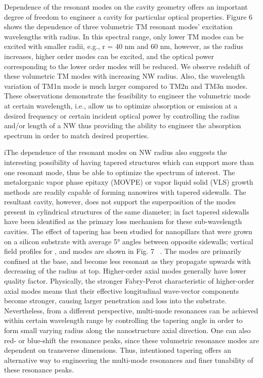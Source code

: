 Dependence of the resonant modes on the cavity geometry offers an important
degree of freedom to engineer a cavity for particular optical properties.
Figure 6 shows the dependence of three volumetric TM resonant modes’ excitation
wavelengths with radius. In this spectral range, only lower TM modes can be
excited with smaller radii, e.g., r = 40 nm and 60 nm, however, as the radius
increases, higher order modes can be excited, and the optical power
corresponding to the lower order modes will be reduced. We observe redshift of
these volumetric TM modes with increasing NW radius. Also, the wavelength
variation of TM1n mode is much larger compared to TM2n and TM3n modes. These
observations demonstrate the feasibility to engineer the volumetric mode at
certain wavelength, i.e., allow us to optimize absorption or emission at a
desired frequency or certain incident optical power  by controlling the radius
and/or length of a NW thus providing the ability to engineer the absorption
spectrum in order to match desired properties.

iThe dependence of the resonant modes on NW radius also suggests the
interesting possibility of having tapered structures which can support more
than one resonant mode, thus be able to optimize the spectrum of interest.  The
metalorganic vapor phase epitaxy (MOVPE) or vapor liquid solid (VLS) growth
methods are readily capable of forming nanowires with tapered sidewalls. The
resultant cavity, however, does not support the superposition of the modes
present in cylindrical structures of the same diameter; in fact tapered
sidewalls have been identified as the primary loss mechanism for these
sub-wavelength cavities.  The effect of  tapering has been studied for
nanopillars that were grown on a silicon substrate with average 5° angles
between opposite sidewalls; vertical field profiles for ,  and  modes are shown
in Fig. 7 ~\cite{Chen:2011cg}. The modes are primarily confined at the base, and become less
resonant as they propagate upwards with decreasing of the radius at top.
Higher-order axial modes generally have lower quality factor. Physically, the
stronger Fabry-Perot characteristic of higher-order axial modes means that
their effective longitudinal wave-vector components become stronger, causing
larger penetration and loss into the substrate. Nevertheless, from a different
perspective, multi-mode resonances can be achieved within certain wavelength
range by controlling the tapering angle in order to form small varying radius
along the nanostructure axial direction. One can also red- or blue-shift the
resonance peaks, since these volumetric resonance modes are dependent on
transverse dimensions. Thus, intentioned tapering offers an alternative way to
engineering the multi-mode resonances and finer tunability of these resonance
peaks.


